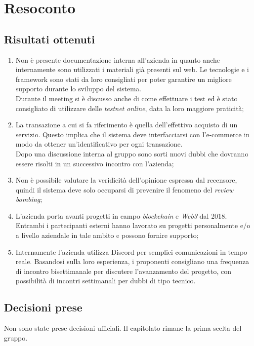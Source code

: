 \section{Resoconto}

\subsection{Risultati ottenuti}
\begin{enumerate}
    \item Non è presente documentazione interna all'azienda in quanto anche internamente sono utilizzati i materiali già presenti sul web. Le tecnologie e i framework sono stati da loro consigliati per poter garantire un migliore supporto durante lo sviluppo del sistema.\\ Durante il meeting si è discusso anche di come effettuare i test ed è stato consigliato di utilizzare delle \emph{testnet online}, data la loro maggiore praticità;
    \item La transazione a cui si fa riferimento è quella dell'effettivo acquisto di un servizio. Questo implica che il sistema deve interfacciarsi con l'e-commerce in modo da ottener un'identificativo per ogni transazione.\\ Dopo una discussione interna al gruppo sono sorti nuovi dubbi che dovranno essere risolti in un successivo incontro con l'azienda;
    \item Non è possibile valutare la veridicità dell'opinione espressa dal recensore, quindi il sistema deve solo occuparsi di prevenire il fenomeno del \textit{review bombing};
    \item L'azienda porta avanti progetti in campo \emph{blockchain} e \emph{Web3} dal 2018. Entrambi i partecipanti esterni hanno lavorato su progetti personalmente e/o a livello aziendale in tale ambito e possono fornire supporto;
    \item Internamente l'azienda utilizza Discord per semplici comunicazioni in tempo reale. Basandosi sulla loro esperienza, i proponenti consigliano una frequenza di incontro bisettimanale per discutere l'avanzamento del progetto, con possibilità di incontri settimanali per dubbi di tipo tecnico.
\end{enumerate}

\subsection{Decisioni prese}
Non sono state prese decisioni ufficiali. Il capitolato rimane la prima scelta del gruppo.